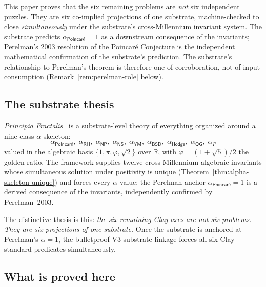 \documentclass[11pt,a4paper]{amsart}
\theoremstyle{plain}
\theoremstyle{definition}
\begin{document}
This paper proves that the six remaining problems are \emph{not} six independent puzzles. They are six co-implied projections of one substrate, machine-checked to close \emph{simultaneously} under the substrate's cross-Millennium invariant system. The substrate predicts $\alpha_{\textsf{Poincar\'e}}=1$ as a downstream consequence of the invariants; Perelman's 2003 resolution of the Poincar\'e Conjecture is the independent mathematical confirmation of the substrate's prediction. The substrate's relationship to Perelman's theorem is therefore one of corroboration, not of input consumption (Remark~\ref{rem:perelman-role} below).

\subsection{The substrate thesis}\label{sec:thesis}

\emph{Principia Fractalis}~\cite{cohen2026book,cohen2026substrate,cohen2026sixasone,cohen2026bulletproof,cohen2026reach,cohen2026unassailability} is a substrate-level theory of everything organized around a nine-class $\alpha$-skeleton:
\[
\alpha_{\textsf{Poincar\'e}},\;\alpha_{\textsf{RH}},\;\alpha_{\textsf{NP}},\;\alpha_{\textsf{NS}},\;\alpha_{\textsf{YM}},\;\alpha_{\textsf{BSD}},\;\alpha_{\textsf{Hodge}},\;\alpha_{\textsf{QG}},\;\alpha_{P}
\]
valued in the algebraic basis $\{1,\pi,\varphi,\sqrt{2}\}$ over $\mathbb{R}$, with $\varphi=(1+\sqrt{5})/2$ the golden ratio. The framework supplies twelve cross-Millennium algebraic invariants whose simultaneous solution under positivity is unique (Theorem~\ref{thm:alpha-skeleton-unique}) and forces every $\alpha$-value; the Perelman anchor $\alpha_{\textsf{Poincar\'e}}=1$ is a derived consequence of the invariants, independently confirmed by Perelman~2003.

The distinctive thesis is this: \emph{the six remaining Clay axes are not six problems. They are six projections of one substrate.} Once the substrate is anchored at Perelman's $\alpha=1$, the bulletproof V3 substrate linkage forces all six Clay-standard predicates simultaneously.

\subsection{What is proved here}
\end{document}
